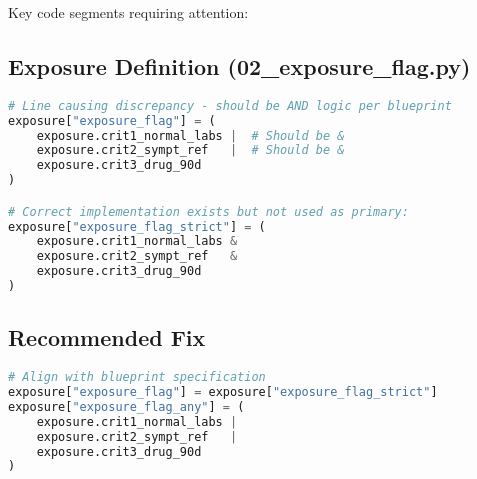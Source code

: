 \documentclass[11pt]{article}
\begin{document}
Key code segments requiring attention:

\subsection{Exposure Definition (02\_exposure\_flag.py)}
\begin{lstlisting}[language=Python, basicstyle=\small]
# Line causing discrepancy - should be AND logic per blueprint
exposure["exposure_flag"] = (
    exposure.crit1_normal_labs |  # Should be &
    exposure.crit2_sympt_ref   |  # Should be &
    exposure.crit3_drug_90d
)

# Correct implementation exists but not used as primary:
exposure["exposure_flag_strict"] = (
    exposure.crit1_normal_labs &
    exposure.crit2_sympt_ref   &
    exposure.crit3_drug_90d
)
\end{lstlisting}

\subsection{Recommended Fix}
\begin{lstlisting}[language=Python, basicstyle=\small]
# Align with blueprint specification
exposure["exposure_flag"] = exposure["exposure_flag_strict"]
exposure["exposure_flag_any"] = (
    exposure.crit1_normal_labs |
    exposure.crit2_sympt_ref   |
    exposure.crit3_drug_90d
)
\end{lstlisting}
\end{document}
